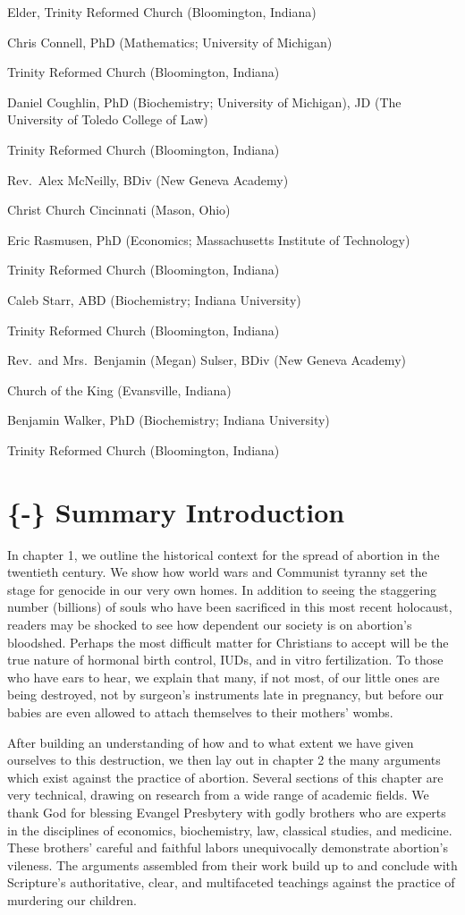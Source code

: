 \documentclass[
]{book}
\begin{document}
Elder, Trinity Reformed Church (Bloomington, Indiana)

Chris Connell, PhD (Mathematics; University of Michigan)

Trinity Reformed Church (Bloomington, Indiana)

Daniel Coughlin, PhD (Biochemistry; University of Michigan), JD (The University of Toledo College of Law)

Trinity Reformed Church (Bloomington, Indiana)

Rev.~Alex McNeilly, BDiv (New Geneva Academy)

Christ Church Cincinnati (Mason, Ohio)

Eric Rasmusen, PhD (Economics; Massachusetts Institute of Technology)

Trinity Reformed Church (Bloomington, Indiana)

Caleb Starr, ABD (Biochemistry; Indiana University)

Trinity Reformed Church (Bloomington, Indiana)

Rev.~and Mrs.~Benjamin (Megan) Sulser, BDiv (New Geneva Academy)

Church of the King (Evansville, Indiana)

Benjamin Walker, PhD (Biochemistry; Indiana University)

Trinity Reformed Church (Bloomington, Indiana)

\hypertarget{summary-introduction}{%
\chapter{\{-\} Summary Introduction}\label{summary-introduction}}

In chapter 1, we outline the historical context for the spread of abortion in the twentieth century. We show how world wars and Communist tyranny set the stage for genocide in our very own homes. In addition to seeing the staggering number (billions) of souls who have been sacrificed in this most recent holocaust, readers may be shocked to see how dependent our society is on abortion's bloodshed. Perhaps the most difficult matter for Christians to accept will be the true nature of hormonal birth control, IUDs, and in vitro fertilization. To those who have ears to hear, we explain that many, if not most, of our little ones are being destroyed, not by surgeon's instruments late in pregnancy, but before our babies are even allowed to attach themselves to their mothers' wombs.

After building an understanding of how and to what extent we have given ourselves to this destruction, we then lay out in chapter 2 the many arguments which exist against the practice of abortion. Several sections of this chapter are very technical, drawing on research from a wide range of academic fields. We thank God for blessing Evangel Presbytery with godly brothers who are experts in the disciplines of economics, biochemistry, law, classical studies, and medicine. These brothers' careful and faithful labors unequivocally demonstrate abortion's vileness. The arguments assembled from their work build up to and conclude with Scripture's authoritative, clear, and multifaceted teachings against the practice of murdering our children.
\end{document}
